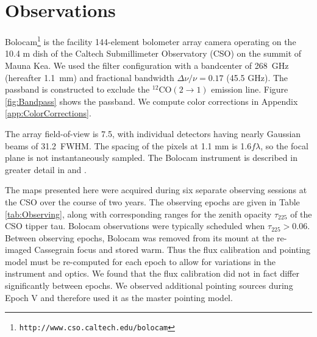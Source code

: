 \documentclass[12pt,preprint]{aastex}
\newcommand{\bcamfwhm}{31.2\arcsec}
\begin{document}
\clearpage

\section{Observations}
\label{sec:Observations}

Bolocam\footnote{{\tt http://www.cso.caltech.edu/bolocam}} is the
facility 144-element bolometer array camera operating on the 10.4 m
dish of the Caltech Submillimeter Observatory (CSO) on the summit of
Mauna Kea.  We used the filter configuration with a bandcenter of
268~GHz (hereafter 1.1~mm) and fractional bandwidth $\Delta \nu/\nu =
0.17$ (45.5 GHz).  The passband is constructed to exclude the $^{12}\mathrm{CO}(2
\to 1)$ emission line.  Figure \ref{fig:Bandpass} shows the passband.
We compute color corrections in Appendix \ref{app:ColorCorrections}.

The array field-of-view is 7\arcmin.5, with individual detectors
having nearly Gaussian beams of \bcamfwhm\ FWHM.  The spacing of the
pixels at 1.1 mm is 1.6$f\lambda$, so the focal plane is not
instantaneously sampled.  The Bolocam instrument is described in greater
detail in \citet{haig04} and \citet{glenn03}.


The maps presented here were acquired during six separate
observing sessions at the CSO over the course of two years.  The
observing epochs are given in Table \ref{tab:Observing}, along with
corresponding ranges for the zenith opacity $\tau_{225}$ of the CSO
tipper tau.  Bolocam
observations were typically scheduled when $\tau_{225} > 0.06$.
Between observing epochs, Bolocam was removed from its mount at
the re-imaged Cassegrain focus and stored warm.  Thus the flux
calibration and pointing model must be re-computed for each epoch to
allow for variations in the instrument and optics.  We found that the
flux calibration did not in fact differ significantly between epochs.
We observed additional pointing sources during Epoch V and therefore
used it as the master pointing model.



\end{document}

